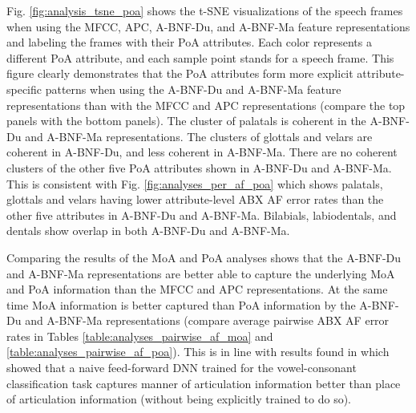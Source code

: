 \documentclass[transmag]{IEEEtran}
\begin{document}
Fig. \ref{fig:analysis_tsne_poa} shows the t-SNE  visualizations  of the speech frames when using the MFCC,  APC, A-BNF-Du, and  A-BNF-Ma  feature representations and labeling the frames with their PoA attributes. Each color represents a different PoA attribute, and each sample point  stands  for  a  speech  frame. This figure clearly demonstrates that the PoA attributes form more explicit attribute-specific patterns when using the A-BNF-Du and A-BNF-Ma feature representations than with the MFCC and APC representations (compare the top panels with the bottom panels). The cluster of palatals is coherent in the  A-BNF-Du and A-BNF-Ma representations. The clusters of glottals and velars are coherent in A-BNF-Du, and less coherent in A-BNF-Ma. There are no coherent clusters of the other five PoA attributes shown in A-BNF-Du and A-BNF-Ma. This is consistent with Fig. \ref{fig:analyses_per_af_poa} which shows palatals, glottals and velars having lower attribute-level ABX AF error rates than the other five attributes in A-BNF-Du and A-BNF-Ma. Bilabials, labiodentals, and dentals show  overlap in both A-BNF-Du and A-BNF-Ma.

Comparing the results of the MoA and PoA analyses shows that the A-BNF-Du and A-BNF-Ma representations are better able to capture the underlying MoA and PoA information than the MFCC and APC representations. At the same time MoA information is better captured than PoA information by the A-BNF-Du and A-BNF-Ma representations (compare average pairwise ABX AF error rates in Tables \ref{table:analyses_pairwise_af_moa} and \ref{table:analyses_pairwise_af_poa}). This is in line with results found in \cite{ScharenborgGLM19representations} which showed that a naive feed-forward DNN trained for the vowel-consonant classification task captures manner of articulation information better than place of articulation information (without being explicitly trained to do so).

\end{document}

